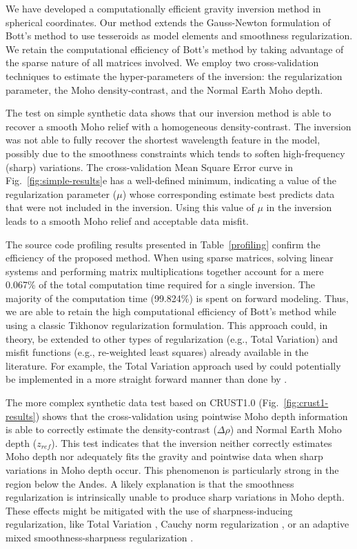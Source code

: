 \documentclass[extra,mreferee]{gji}
\begin{document}
We have developed a computationally efficient gravity inversion method in
spherical coordinates.
Our method extends the Gauss-Newton formulation of Bott's method
\citep{silva2014} to use tesseroids as model elements and smoothness
regularization.
We retain the computational efficiency of Bott's method by taking advantage of
the sparse nature of all matrices involved.
We employ two cross-validation techniques to estimate the hyper-parameters of
the inversion: the regularization parameter, the Moho density-contrast, and the
Normal Earth Moho depth.

The test on simple synthetic data shows that our inversion method is able to
recover a smooth Moho relief with a homogeneous density-contrast.
The inversion was not able to fully recover the shortest wavelength feature in
the model, possibly due to the smoothness constraints which tends to soften
high-frequency (sharp) variations.
The cross-validation Mean Square Error curve in Fig.~\ref{fig:simple-results}e
has a well-defined minimum, indicating a value of the regularization parameter
($\mu$) whose corresponding estimate best predicts data that were not included
in the inversion.
Using this value of $\mu$ in the inversion leads to a smooth Moho relief and
acceptable data misfit.

The source code profiling results presented in Table~\ref{profiling}
confirm the efficiency of the proposed method.
When using sparse matrices, solving linear systems and performing matrix
multiplications together account for a mere 0.067\% of the total computation
time required for a single inversion.
The majority of the computation time (99.824\%) is spent on forward modeling.
Thus, we are able to retain the high computational efficiency of Bott's method
while using a classic Tikhonov regularization formulation.
This approach could, in theory, be extended to other types of regularization
(e.g., Total Variation) and misfit functions (e.g., re-weighted least squares)
already available in the literature.
For example, the Total Variation approach used by \citet{martins2011} could
potentially be implemented in a more straight forward manner than done by
\citet{santos2015}.

The more complex synthetic data test based on CRUST1.0
(Fig.~\ref{fig:crust1-results})
shows that the cross-validation using pointwise Moho depth information
is able to correctly estimate the density-contrast ($\Delta\rho$) and Normal
Earth Moho depth ($z_{ref}$).
This test indicates that the inversion neither correctly estimates Moho depth
nor adequately fits the gravity and pointwise data when sharp variations in
Moho depth occur.
This phenomenon is particularly strong in the region below the Andes.
A likely explanation is that the smoothness regularization
is intrinsically unable to produce sharp variations in Moho depth.
These effects might be mitigated with the use of sharpness-inducing
regularization, like Total Variation \citep{martins2011},
Cauchy norm regularization \citep{sacchi1996, pilkington2008},
or an adaptive mixed smoothness-sharpness regularization \citep{sun2014}.
\end{document}
